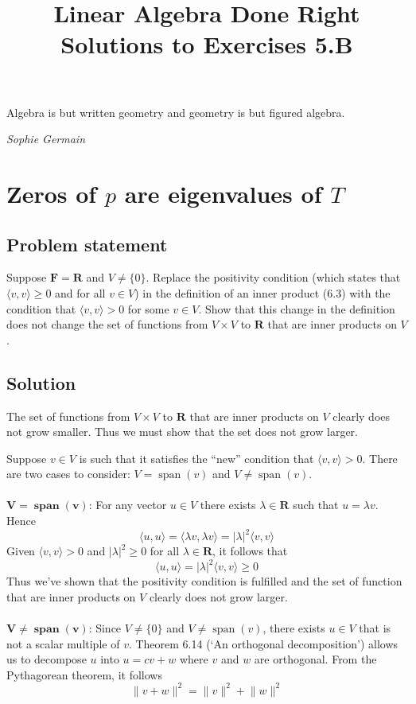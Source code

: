 \documentclass{article}
\title{Linear Algebra Done Right\\Solutions to Exercises 5.B}
\author{}
\date{}
\providecommand{\abs}[1]{\lvert#1\rvert} \providecommand{\norm}[1]{\lVert#1\rVert}
\begin{document}
\maketitle

\epigraph{Algebra is but written geometry and geometry is but figured algebra.}{\textit{Sophie Germain}}

\clearpage

\renewcommand{\thesection}{3}
\section{Zeros of $p$ are eigenvalues of $T$}
\subsection*{Problem statement}
Suppose $\mathbf{F}=\mathbf{R}$ and $V\neq \{0\}$. Replace the positivity condition (which states that $\langle v, v\rangle\geq 0$ and for all $v\in V$) in the definition of an inner product (6.3) with the condition that $\langle v, v\rangle > 0$ for some $v\in V$. Show that this change in the definition does not change the set of functions from $V\times V$ to $\mathbf{R}$ that are inner products on $V$.

\subsection*{Solution}
The set of functions from $V\times V$ to $\mathbf{R}$ that are inner products on $V$ clearly does not grow smaller. Thus we must show that the set does not grow larger.

Suppose $v\in V$ is such that it satisfies the ``new'' condition that $\langle v, v\rangle > 0$. There are two cases to consider: $V=\operatorname{span}(v)$ and $V\neq\operatorname{span}(v)$.
\\
\\
$\mathbf{{V=\operatorname{\textbf{span}}(v)}}$: For any vector $u\in V$ there exists $\lambda\in\mathbf{R}$ such that $u=\lambda v$. Hence 
\[\langle u, u\rangle =\langle \lambda v, \lambda v \rangle = \abs{\lambda}^2\langle v, v\rangle \]
Given $\langle v, v\rangle > 0$ and $|\lambda|^2\geq 0$ for all $\lambda\in\mathbf{R}$, it follows that 
\[\langle u, u\rangle = |\lambda|^2\langle v, v\rangle \geq 0\]
Thus we've shown that the positivity condition is fulfilled and the set of function that are inner products on $V$ clearly does not grow larger.
\\
\\
$\mathbf{V\neq\operatorname{\textbf{span}}(v)}$: Since $V\neq \{0\}$ and $V\neq\operatorname{span}(v)$, there exists $u\in V$ that is not a scalar multiple of $v$. Theorem 6.14 (`An orthogonal decomposition') allows us to decompose $u$ into $u=cv+w$ where $v$ and $w$ are orthogonal. From the Pythagorean theorem, it follows
\[\norm{v+w}^2=\norm{v}^2+\norm{w}^2\]
\end{document}

